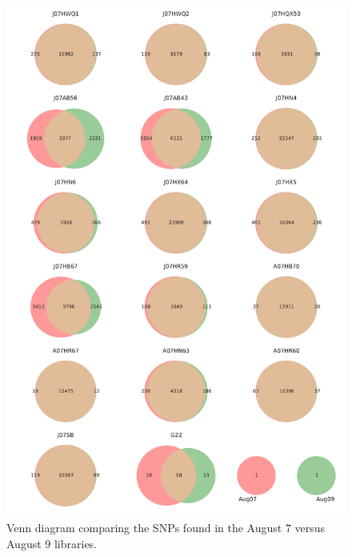 \begin{figure}[!hbtp]
  \centering
  \includegraphics[width=\textwidth,height=0.9\textheight,keepaspectratio]{Chapter5/Figures/Venn_AugustSNPs.pdf}
  \caption{Venn diagram comparing the SNPs found in the August 7 versus August 9 libraries.}
  \label{VennAug}
\end{figure}

